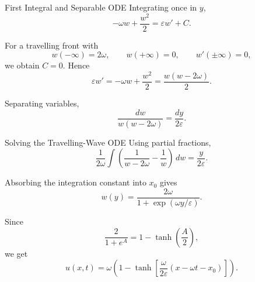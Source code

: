 \documentclass[aspectratio=169,11pt]{beamer}
\begin{document}
\begin{frame}{First Integral and Separable ODE}
    Integrating once in $y$,
    \begin{equation}
        -\omega w+\frac{w^2}{2}=\varepsilon w'+C.
    \end{equation}

    For a travelling front with
    \begin{equation}
        w(-\infty)=2\omega,\qquad w(+\infty)=0,\qquad w'(\pm\infty)=0,
    \end{equation}
    we obtain $C=0$. Hence
    \begin{equation}
        \varepsilon w'
        =
        -\omega w+\frac{w^2}{2}
        =
        \frac{w(w-2\omega)}{2}.
    \end{equation}

    Separating variables,
    \begin{equation}
        \frac{dw}{w(w-2\omega)}=\frac{dy}{2\varepsilon}.
    \end{equation}
\end{frame}

\begin{frame}{Solving the Travelling-Wave ODE}
    Using partial fractions,
    \begin{equation}
        \frac{1}{2\omega}
        \int\left(\frac{1}{w-2\omega}-\frac{1}{w}\right)\,dw
        =
        \frac{y}{2\varepsilon}.
    \end{equation}

    Absorbing the integration constant into $x_0$ gives
    \begin{equation}
        w(y)=\frac{2\omega}{1+\exp(\omega y/\varepsilon)}.
    \end{equation}

    Since
    \begin{equation}
        \frac{2}{1+e^A}=1-\tanh\left(\frac{A}{2}\right),
    \end{equation}
    we get
    \begin{equation}
        \boxed{
        u(x,t)=\omega\left(1-\tanh\left[
        \frac{\omega}{2\varepsilon}(x-\omega t-x_0)
        \right]\right).}
    \end{equation}
\end{frame}
\end{document}
